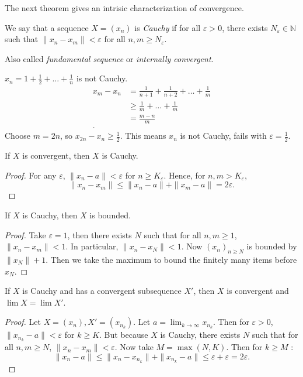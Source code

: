 The next theorem gives an intrisic characterization of convergence.
\begin{theorem}
	We say that a sequence  $X = (x_n)$ is \textit{Cauchy} if for all $\varepsilon>0$, there exists $N_\varepsilon \in \mathbb{N}$ such that $\|x_n - x_m\|<\varepsilon$ for all $n, m \ge N_\varepsilon$.
\end{theorem}
Also called \textit{fundamental sequence} or \textit{internally convergent}.
\begin{example}
	$x_n = 1 + \frac{1}{2} + \ldots + \frac{1}{n}$ is not Cauchy.
	\begin{align*}
		x_m - x_n &= \frac{1}{n+1} + \frac{1}{n+2} + \ldots + \frac{1}{m} \\
		&\ge  \frac{1}{m} + \ldots + \frac{1}{m} \\
		&= \frac{m-n}{m} \\
	.\end{align*}
	Choose $m = 2n$, so $x_{2n} - x_n \ge \frac{1}{2}$. This means $x_n$ is not Cauchy, fails with $\varepsilon = \frac{1}{2}$.
\end{example}

\begin{theorem}
	If $X$ is convergent, then $X$ is Cauchy.
\end{theorem}
\begin{proof}
	For any $\varepsilon$, $\|x_n - a\|<\varepsilon$ for $n \ge K_{\varepsilon}$. Hence, for $n, m > K_\varepsilon$, 
	\[
		\|x_n - x_m\| \le \|x_n - a\|+ \|x_m - a\| = 2 \varepsilon
	.\] 
\end{proof}

\begin{theorem}
	If $X$ is Cauchy, then $X$ is bounded.
\end{theorem}
\begin{proof}
	Take $\varepsilon = 1$, then there exists $N$ such that for all $n, m \ge 1$, $\|x_n - x_m\|<1$. In particular, $\|x_n - x_N\|<1$. Now $(x_n)_{n\ge N}$ is bounded by $\|x_N\| + 1$. Then we take the maximum to bound the finitely many items before $x_N$.
\end{proof}

\begin{lemma}
	If $X$ is Cauchy and has a convergent subsequence $X'$, then $X$ is convergent and $\lim X = \lim X'$.
\end{lemma}
\begin{proof}
	Let $X = (x_n), X' = (x_{n_k})$. Let $a = \lim_{k\to \infty } x_{n_k}$.
	Then for $\varepsilon>0$, $\|x_{n_k}- a\|<\varepsilon$ for $k \ge K$. 
	But because $X$ is Cauchy, there exists  $N$ such that for all $n, m \ge N$, $\|x_n - x_m\|<\varepsilon$. Now take $M = \max(N, K)$. Then for $k \ge M$ :
	\[
		\|x_n - a\|\le \|x_n - x_{n_k}\| + \|x_{n_k} - a\| \le \varepsilon + \varepsilon = 2 \varepsilon
	.\] 
\end{proof}

